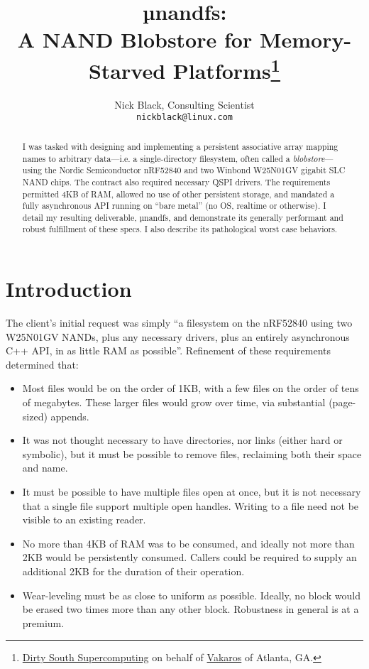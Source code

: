 \documentclass[letterpaper,10pt]{article}
\title{µnandfs:\\
A NAND Blobstore for Memory-Starved Platforms\thanks{
 \href{https://www.dsscaw.com/}{Dirty South Supercomputing} on behalf
 of \href{https://www.vakaros.com/}{Vakaros} of Atlanta, GA.
}\\
}
\author{Nick Black, Consulting Scientist\\
\texttt{nickblack@linux.com}
}
\newenvironment{denseitemize}{
  \begin{itemize}
      \setlength{\itemsep}{0pt}
}{
  \end{itemize}
}
\begin{document}
\maketitle
\thispagestyle{fancy}
\date{}
\begin{abstract}
I was tasked with designing and implementing a persistent associative array
mapping names to arbitrary data---i.e. a single-directory filesystem, often
called a \textit{blobstore}---using the Nordic Semiconductor nRF52840 and two
Winbond W25N01GV gigabit SLC NAND chips. The contract also required necessary
QSPI drivers. The requirements permitted 4KB of RAM,
allowed no use of other persistent storage, and mandated a fully asynchronous
API running on ``bare metal'' (no OS, realtime or otherwise). I detail my
resulting deliverable, µnandfs, and demonstrate its generally performant
and robust fulfillment of these specs. I also describe its pathological worst
case behaviors.
\end{abstract}
\section{Introduction}
The client's initial request was simply ``a filesystem on the nRF52840 using
two W25N01GV NANDs, plus any necessary drivers, plus an entirely asynchronous
C++ API, in as little RAM as possible''. Refinement of these requirements
determined that:
\begin{denseitemize}
\item Most files would be on the order of 1KB, with a few files
       on the order of tens of megabytes. These larger files would grow
       over time, via substantial (page-sized) appends.
\item It was not thought necessary to have directories, nor links (either hard
       or symbolic), but it must be possible to remove files, reclaiming both
       their space and name.
\item It must be possible to have multiple files open at once, but it is not
       necessary that a single file support multiple open handles. Writing
       to a file need not be visible to an existing reader.
\item No more than 4KB of RAM was to be consumed, and ideally not more than 2KB
       would be persistently consumed. Callers could be required to supply
       an additional 2KB for the duration of their operation.
\item Wear-leveling must be as close to uniform as possible. Ideally, no block
       would be erased two times more than any other block. Robustness in
       general is at a premium.
\end{denseitemize}
\end{document}
